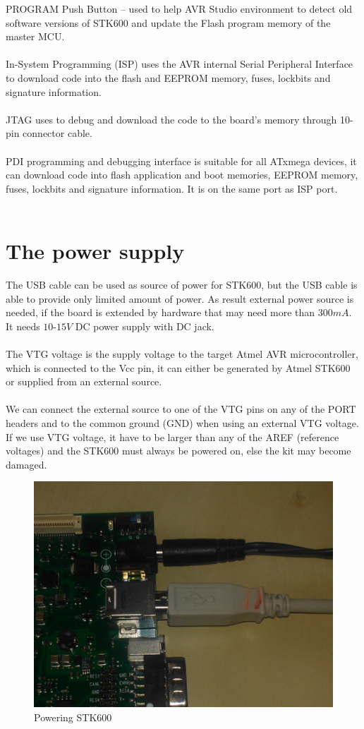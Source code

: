 \documentclass[english]{article}
\begin{document}
PROGRAM Push Button – used to help AVR Studio environment to detect old software versions of STK600 and update the Flash program memory of the master MCU.\\\\
In-System Programming (ISP) uses the AVR internal Serial Peripheral Interface to download code into the flash and EEPROM memory, fuses, lockbits and signature information.\\\\
JTAG uses to debug and download the code to the board’s memory through 10-pin connector cable.\\\\
PDI programming and debugging interface is suitable for all ATxmega devices, it can download code into flash application and boot memories, EEPROM memory, fuses, lockbits and signature information. It is on the same port as ISP port.\\\\
\section{The power supply}
The USB cable can be used as source of power for STK600, but the USB cable is able to provide only limited amount of power. As result external power source is needed, if the board is extended by hardware that may need more than $300mA$. It needs $10$-$15V$ DC power supply with DC jack.\\\\
The VTG voltage is the supply voltage to the target Atmel AVR microcontroller, which is connected to the Vcc pin, it can either be generated by Atmel STK600 or supplied from an external source.\\\\
We can connect the external source to one of the VTG pins on any of the PORT headers and to the common ground (GND) when using an external VTG voltage. If we use VTG voltage, it have to be larger than any of the AREF (reference voltages) and the STK600 must always be powered on, else the kit may become damaged.  
\begin{figure}[H]
\centerline{\includegraphics[scale=0.8]{MicroLab2/image011}}
\caption{Powering STK600}
\end{figure}
\end{document}
